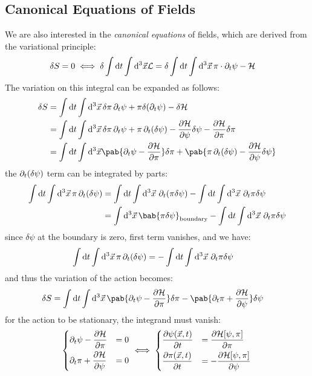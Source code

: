 \subsection{Canonical Equations of Fields}
We are also interested in the \emph{canonical equations} of fields, which are derived from the variational principle:
\begin{align}
  \fdif{S} = 0 \iff \delta \int \odif{t} \int \odif[3]{\vec{x}} \lagr & = \delta \int \odif{t} \int \odif[3]{\vec{x}} \, \pi \cdot \pdif{t} \psi - \hami
\end{align}
The variation on this integral can be expanded as follows:
\begin{align}
  \delta S & = \int \odif{t} \int \odif[3]{\vec{x}} \, \delta \pi \pdif{t} \psi + \pi \delta(\pdif{t} \psi) - \delta \hami                                                 \\
           & = \int \odif{t} \int \odif[3]{\vec{x}} \, \delta \pi \pdif{t} \psi + \pi \pdif{t} (\delta \psi) - \pdv{\hami}{\psi} \delta \psi - \pdv{\hami}{\pi} \delta \pi \\
           & = \int \odif{t} \int \odif[3]{\vec{x}} \pab{\pdif{t} \psi - \pdv{\hami}{\pi}} \delta \pi + \pab{\pi \pdif{t}(\delta \psi) - \pdv{\hami}{\psi} \delta \psi}
\end{align}
the $\pdif{t}(\delta \psi)$ term can be integrated by parts:
\begin{align}
  \int \odif{t} \int \odif[3]{\vec{x}} \, \pi \pdif{t}(\delta \psi)
   & = \int \odif{t} \int \odif[3]{\vec{x}} \, \pdif{t} ( \pi \delta \psi) - \int \odif{t} \int \odif[3]{\vec{x}} \, \pdif{t} \pi \delta \psi \\
   & = \int \odif[3]{\vec{x}} \, \bab{ \pi \delta \psi}_{\text{boundary}} - \int \odif{t} \int \odif[3]{\vec{x}} \, \pdif{t} \pi \delta \psi
\end{align}
since $\delta \psi$ at the boundary is zero, first term vanishes, and we have:
\begin{align}
  \int \odif{t} \int \odif[3]{\vec{x}} \, \pi \pdif{t}(\delta \psi) & = - \int \odif{t} \int \odif[3]{\vec{x}} \, \pdif{t} \pi \delta \psi
\end{align}
and thus the variation of the action becomes:
\begin{align}
  \delta S & = \int \odif{t} \int \odif[3]{\vec{x}} \, \pab{\pdif{t} \psi - \pdv{\hami}{\pi}} \delta \pi - \pab{\pdif{t} \pi + \pdv{\hami}{\psi}} \delta \psi
\end{align}
for the action to be stationary, the integrand must vanish:
\begin{align}
  \begin{dcases}
    \pdif{t} \psi - \pdv{\hami}{\pi} & = 0 \\
    \pdif{t} \pi + \pdv{\hami}{\psi} & = 0
  \end{dcases} \iff
  \begin{dcases}
    \pdv{\psi(\vec{x}, t)}{t} & = \pdv{\hami[\psi, \pi]}{\pi}   \\
    \pdv{\pi(\vec{x}, t)}{t}  & = -\pdv{\hami[\psi, \pi]}{\psi}
  \end{dcases}
\end{align}
